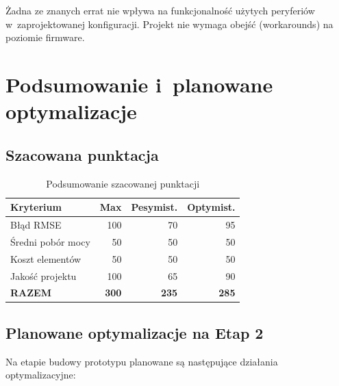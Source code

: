 \documentclass[a4paper,11pt]{article}
\begin{document}
	Żadna ze znanych errat nie wpływa na funkcjonalność użytych peryferiów
	w~zaprojektowanej konfiguracji. Projekt nie wymaga obejść (workarounds)
	na poziomie firmware.
	
	
	\section{Podsumowanie i~planowane optymalizacje}
	\label{sec:podsumowanie}
	
	\subsection{Szacowana punktacja}
	
	\begin{table}[H]
		\centering
		\caption{Podsumowanie szacowanej punktacji}
		\label{tab:punktacja}
		\begin{tabular}{lrrr}
			\toprule
			\textbf{Kryterium} & \textbf{Max} & \textbf{Pesymist.} & \textbf{Optymist.} \\
			\midrule
			Błąd RMSE         & 100 & 70  & 95 \\
			Średni pobór mocy & 50  & 50  & 50 \\
			Koszt elementów   & 50  & 50  & 50 \\
			Jakość projektu   & 100 & 65  & 90 \\
			\midrule
			\textbf{RAZEM}    & \textbf{300} & \textbf{235} & \textbf{285} \\
			\bottomrule
		\end{tabular}
	\end{table}
	
	\subsection{Planowane optymalizacje na Etap 2}
	
	Na etapie budowy prototypu planowane są następujące działania optymalizacyjne:
	
\end{document}
